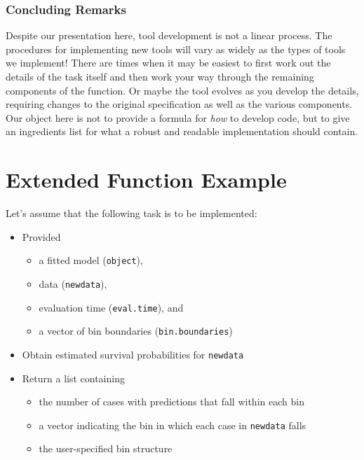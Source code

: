 \documentclass[
]{book}
\providecommand{\tightlist}{%
  \setlength{\itemsep}{0pt}\setlength{\parskip}{0pt}}
\begin{document}
\hypertarget{concluding-remarks}{%
\subsection{Concluding Remarks}\label{concluding-remarks}}

Despite our presentation here, tool development is not a linear process. The procedures for implementing new tools will vary as widely as the types of tools we implement! There are times when it may be easiest to first work out the details of the task itself and then work your way through the remaining components of the function. Or maybe the tool evolves as you develop the details, requiring changes to the original specification as well as the various components. Our object here is not to provide a formula for \emph{how} to develop code, but to give an ingredients list for what a robust and readable implementation should contain.

\hypertarget{extended-function-example}{%
\chapter{Extended Function Example}\label{extended-function-example}}

Let's assume that the following task is to be implemented:

\begin{itemize}
\tightlist
\item
  Provided

  \begin{itemize}
  \tightlist
  \item
    a fitted model (\texttt{object}),
  \item
    data (\texttt{newdata}),
  \item
    evaluation time (\texttt{eval.time}), and
  \item
    a vector of bin boundaries (\texttt{bin.boundaries})
  \end{itemize}
\item
  Obtain estimated survival probabilities for \texttt{newdata}
\item
  Return a list containing

  \begin{itemize}
  \tightlist
  \item
    the number of cases with predictions that fall within each bin
  \item
    a vector indicating the bin in which each case in \texttt{newdata} falls
  \item
    the user-specified bin structure
  \end{itemize}
\end{itemize}
\end{document}

